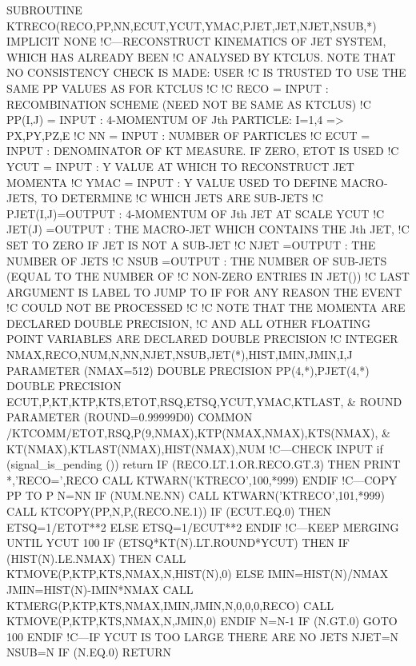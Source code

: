     SUBROUTINE KTRECO(RECO,PP,NN,ECUT,YCUT,YMAC,PJET,JET,NJET,NSUB,*)
      IMPLICIT NONE
!C---RECONSTRUCT KINEMATICS OF JET SYSTEM, WHICH HAS ALREADY BEEN
!C   ANALYSED BY KTCLUS. NOTE THAT NO CONSISTENCY CHECK IS MADE: USER
!C   IS TRUSTED TO USE THE SAME PP VALUES AS FOR KTCLUS
!C
!C   RECO     = INPUT : RECOMBINATION SCHEME (NEED NOT BE SAME AS KTCLUS)
!C   PP(I,J)  = INPUT : 4-MOMENTUM OF Jth PARTICLE: I=1,4 => PX,PY,PZ,E
!C   NN       = INPUT : NUMBER OF PARTICLES
!C   ECUT     = INPUT : DENOMINATOR OF KT MEASURE. IF ZERO, ETOT IS USED
!C   YCUT     = INPUT : Y VALUE AT WHICH TO RECONSTRUCT JET MOMENTA
!C   YMAC     = INPUT : Y VALUE USED TO DEFINE MACRO-JETS, TO DETERMINE
!C                        WHICH JETS ARE SUB-JETS
!C   PJET(I,J)=OUTPUT : 4-MOMENTUM OF Jth JET AT SCALE YCUT
!C   JET(J)   =OUTPUT : THE MACRO-JET WHICH CONTAINS THE Jth JET,
!C                        SET TO ZERO IF JET IS NOT A SUB-JET
!C   NJET     =OUTPUT : THE NUMBER OF JETS
!C   NSUB     =OUTPUT : THE NUMBER OF SUB-JETS (EQUAL TO THE NUMBER OF
!C                        NON-ZERO ENTRIES IN JET())
!C   LAST ARGUMENT IS LABEL TO JUMP TO IF FOR ANY REASON THE EVENT
!C   COULD NOT BE PROCESSED
!C
!C   NOTE THAT THE MOMENTA ARE DECLARED DOUBLE PRECISION,
!C   AND ALL OTHER FLOATING POINT VARIABLES ARE DECLARED DOUBLE PRECISION
!C
      INTEGER NMAX,RECO,NUM,N,NN,NJET,NSUB,JET(*),HIST,IMIN,JMIN,I,J
      PARAMETER (NMAX=512)
      DOUBLE PRECISION PP(4,*),PJET(4,*)
      DOUBLE PRECISION ECUT,P,KT,KTP,KTS,ETOT,RSQ,ETSQ,YCUT,YMAC,KTLAST, &
           ROUND
      PARAMETER (ROUND=0.99999D0)
      COMMON /KTCOMM/ETOT,RSQ,P(9,NMAX),KTP(NMAX,NMAX),KTS(NMAX), &
           KT(NMAX),KTLAST(NMAX),HIST(NMAX),NUM
!C---CHECK INPUT
      if (signal_is_pending ()) return
      IF (RECO.LT.1.OR.RECO.GT.3) THEN
         PRINT *,'RECO=',RECO
         CALL KTWARN('KTRECO',100,*999)
      ENDIF
!C---COPY PP TO P
      N=NN
      IF (NUM.NE.NN) CALL KTWARN('KTRECO',101,*999)
      CALL KTCOPY(PP,N,P,(RECO.NE.1))
      IF (ECUT.EQ.0) THEN
         ETSQ=1/ETOT**2
      ELSE
         ETSQ=1/ECUT**2
      ENDIF
!C---KEEP MERGING UNTIL YCUT
 100  IF (ETSQ*KT(N).LT.ROUND*YCUT) THEN
         IF (HIST(N).LE.NMAX) THEN
            CALL KTMOVE(P,KTP,KTS,NMAX,N,HIST(N),0)
         ELSE
            IMIN=HIST(N)/NMAX
            JMIN=HIST(N)-IMIN*NMAX
            CALL KTMERG(P,KTP,KTS,NMAX,IMIN,JMIN,N,0,0,0,RECO)
            CALL KTMOVE(P,KTP,KTS,NMAX,N,JMIN,0)
         ENDIF
         N=N-1
         IF (N.GT.0) GOTO 100
      ENDIF
!C---IF YCUT IS TOO LARGE THERE ARE NO JETS
      NJET=N
      NSUB=N
      IF (N.EQ.0) RETURN
